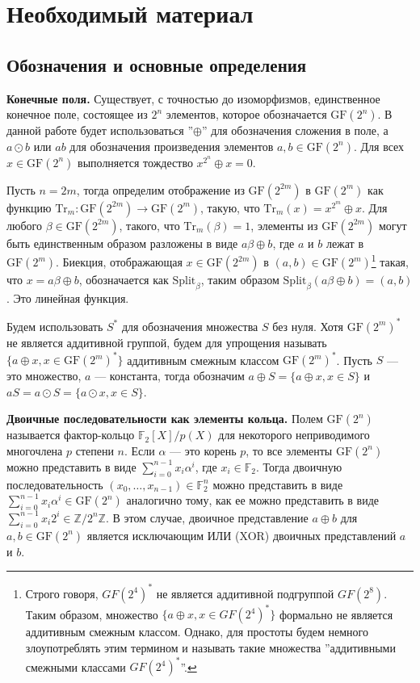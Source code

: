 \section{Необходимый материал}
\subsection{Обозначения и основные определения}
\textbf{Конечные поля.} Существует, с точностью до изоморфизмов, единственное конечное поле, состоящее из \(2^n\) элементов, которое обозначается \(\text{GF}(2^n)\). В данной работе будет использоваться ''\(\oplus\)'' для обозначения сложения в поле, а \(a \odot b\) или \(ab\) для обозначения произведения элементов \(a, b \in \text{GF}(2^n)\). Для всех \(x \in \text{GF}(2^n)\) выполняется тождество \(x^{2^n} \oplus x = 0\).

Пусть \(n = 2m\), тогда определим отображение из \(\text{GF}(2^{2m})\) в \(\text{GF}(2^m)\) как функцию \(\text{Tr}_m: \text{GF}(2^{2m}) \rightarrow \text{GF}(2^m)\), такую, что \(\text{Tr}_m(x) = x^{2^m} \oplus x\). Для любого \(\beta \in \text{GF}(2^{2m})\), такого, что \(\text{Tr}_m(\beta) = 1\), элементы из \(\text{GF}(2^{2m})\) могут быть единственным образом разложены в виде \(a\beta \oplus b\), где \(a\) и \(b\) лежат в \(\text{GF}(2^m)\). Биекция, отображающая \(x \in \text{GF}(2^{2m})\) в \((a, b) \in \text{GF}(2^m)\)\footnote{Строго говоря, \(GF(2^4)^*\) не является аддитивной подгруппой \(GF(2^8)\). Таким образом, множество \(\{a \oplus x, x \in GF(2^4)^*\}\) формально не является аддитивным смежным классом. Однако, для простоты будем немного злоупотреблять этим термином и называть такие множества ''аддитивными смежными классами \(GF(2^4)^*\)''.} такая, что \(x = a\beta \oplus b\), обозначается как \(\text{Split}_\beta\), таким образом \(\text{Split}_\beta(a\beta \oplus b) = (a, b)\). Это линейная функция.

Будем использовать \(S^*\) для обозначения множества \(S\) без нуля. Хотя \(\text{GF}(2^m)^*\) не является аддитивной группой, будем для упрощения называть \(\{a \oplus x, x \in \text{GF}(2^m)^*\}\) аддитивным смежным классом \(\text{GF}(2^m)^*\). Пусть \(S\) — это множество, \(a\) — константа, тогда обозначим \(a \oplus S = \{a \oplus x, x \in S\}\) и \(aS = a \odot S = \{a \odot x, x \in S\}\).

\textbf{Двоичные последовательности как элементы кольца.} Полем \(\text{GF}(2^n)\) называется фактор-кольцо \(\mathbb{F}_2[X]/p(X)\) для некоторого неприводимого многочлена \(p\) степени \(n\). Если \(\alpha\) — это корень \(p\), то все элементы \(\text{GF}(2^n)\) можно представить в виде \(\sum_{i=0}^{n-1} x_i \alpha^i\), где \(x_i \in \mathbb{F}_2\). Тогда двоичную последовательность \((x_0, \ldots, x_{n-1}) \in \mathbb{F}_2^n\) можно представить в виде \(\sum_{i=0}^{n-1} x_i \alpha^i \in \text{GF}(2^n)\) аналогично тому, как ее можно представить в виде \(\sum_{i=0}^{n-1} x_i 2^i \in \mathbb{Z}/2^n\mathbb{Z}\). В этом случае, двоичное представление \(a \oplus b\) для \(a, b \in \text{GF}(2^n)\) является исключающим ИЛИ (XOR) двоичных представлений \(a\) и \(b\).

